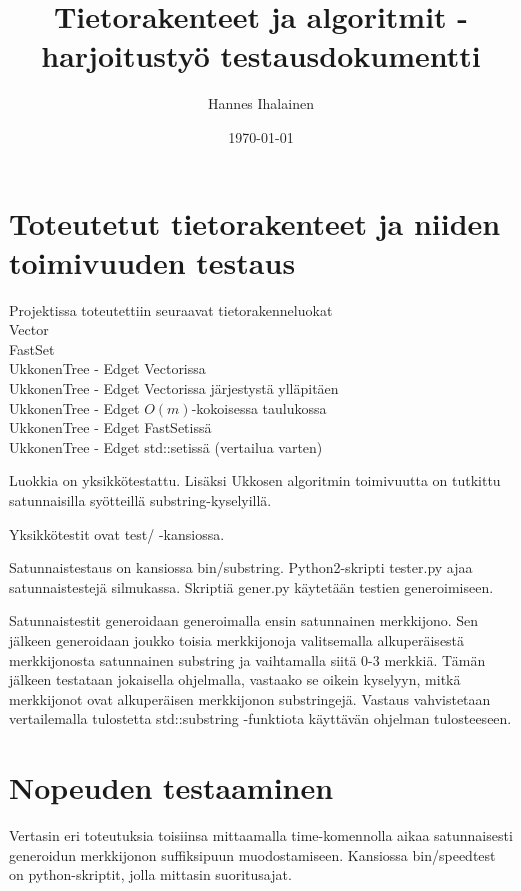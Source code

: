 \documentclass{article}
\title{Tietorakenteet ja algoritmit -harjoitustyö testausdokumentti}
\author{Hannes Ihalainen}
\date{\today}
\begin{document}
    \maketitle
    \newpage
    \tableofcontents
    \newpage
    \section{Toteutetut tietorakenteet ja niiden toimivuuden testaus}
        Projektissa toteutettiin seuraavat tietorakenneluokat \\
        Vector \\
        FastSet \\
        UkkonenTree - Edget Vectorissa \\
        UkkonenTree - Edget Vectorissa järjestystä ylläpitäen \\
        UkkonenTree - Edget $O(m)$-kokoisessa taulukossa \\
        UkkonenTree - Edget FastSetissä \\
        UkkonenTree - Edget std::setissä (vertailua varten) 

        Luokkia on yksikkötestattu. Lisäksi Ukkosen algoritmin toimivuutta on tutkittu satunnaisilla syötteillä
        substring-kyselyillä.

        Yksikkötestit ovat test/ -kansiossa.

        Satunnaistestaus on kansiossa bin/substring. Python2-skripti tester.py ajaa satunnaistestejä silmukassa. 
        Skriptiä gener.py käytetään testien generoimiseen.

        Satunnaistestit generoidaan generoimalla ensin satunnainen merkkijono. Sen jälkeen generoidaan joukko toisia 
        merkkijonoja valitsemalla alkuperäisestä merkkijonosta satunnainen substring ja vaihtamalla siitä 0-3 merkkiä. 
        Tämän jälkeen testataan jokaisella ohjelmalla, vastaako se oikein kyselyyn, mitkä merkkijonot ovat alkuperäisen
        merkkijonon substringejä. Vastaus vahvistetaan vertailemalla tulostetta std::substring -funktiota käyttävän 
        ohjelman tulosteeseen.

    \section{Nopeuden testaaminen}

        Vertasin eri toteutuksia toisiinsa mittaamalla time-komennolla aikaa satunnaisesti generoidun merkkijonon suffiksipuun muodostamiseen. Kansiossa bin/speedtest on python-skriptit, jolla mittasin suoritusajat.
\end{document}
